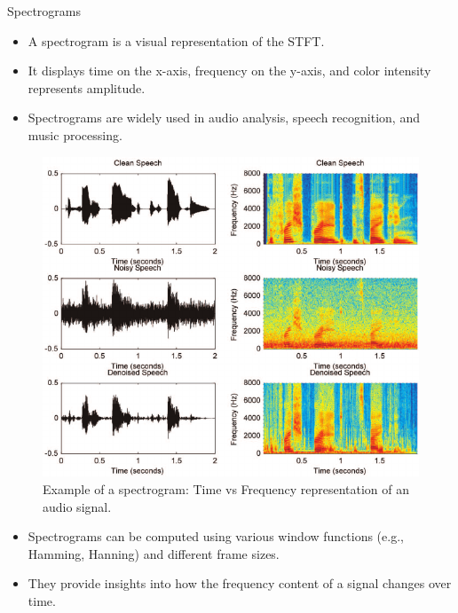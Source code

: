 \begin{frame}[allowframebreaks]{Spectrograms}
    \begin{itemize}
        \item A spectrogram is a visual representation of the STFT.
        \item It displays time on the x-axis, frequency on the y-axis, and color intensity represents amplitude.
        \item Spectrograms are widely used in audio analysis, speech recognition, and music processing.
    \end{itemize}
    \begin{figure}
        \centering
        \includegraphics[width=\textwidth,height=0.8\textheight,keepaspectratio]{images/audio-nlp/spectrogram-example.png}
        \caption*{Example of a spectrogram: Time vs Frequency representation of an audio signal.}
    \end{figure}
    \begin{itemize}
        \item Spectrograms can be computed using various window functions (e.g., Hamming, Hanning) and different frame sizes.
        \item They provide insights into how the frequency content of a signal changes over time.
    \end{itemize}
    \begin{figure}
        \centering

\end{figure}
\end{frame}

